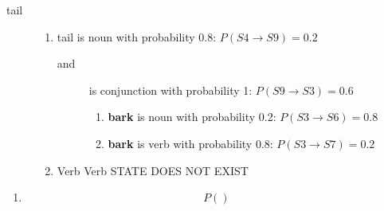 \documentclass{article}
\begin{document}
\begin{enumerate}
\begin{description}
		\item [tail]
		\begin{enumerate}
			\item tail is noun with probability 0.8: $P(S4\rightarrow S9)=0.2$
			\begin{description}
				\item [and] is conjunction with probability 1: $P(S9\rightarrow S3)=0.6$
				\begin{enumerate}
					\item \textbf{bark} is noun with probability 0.2: $P(S3\rightarrow S6)=0.8$
					\item \textbf{bark} is verb with probability 0.8: $P(S3\rightarrow S7)=0.2$
				\end{enumerate}
			\end{description}
			\item Verb Verb STATE DOES NOT EXIST
		\end{enumerate}
	\end{description}
\end{enumerate}
\begin{enumerate}
	\item $$P()$$
\end{enumerate}
\end{document}
